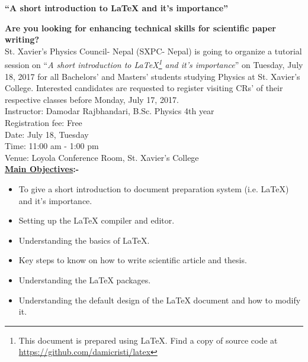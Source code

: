 \documentclass[a4paper,10pt]{article}
\begin{document}
\vspace*{2.1cm}

\begin{center}
\bfseries \LARGE \textquotedblleft A short introduction to \LaTeX \hspace{0.01cm} and it's importance\textquotedblright
\end{center}

\vspace{0.1cm} 

\textbf{Are you looking for enhancing technical skills for scientific paper writing?}\\

St. Xavier's Physics Council- Nepal (SXPC- Nepal) is going to organize a tutorial session on  \textquotedblleft \textit{A short introduction to \LaTeX\footnote{This document is prepared using \LaTeX. Find a copy of source code at \url{https://github.com/damicristi/latex}} and it's importance}\textquotedblright \hspace{0.01cm} on Tuesday, July 18, 2017 for all Bachelors' and Masters' students studying Physics at St. Xavier's College. Interested candidates are requested to register visiting CRs' of their respective classes before Monday, July 17, 2017. \\

Instructor: Damodar Rajbhandari, B.Sc. Physics 4th year\\
\hspace*{0.43cm} Registration fee: Free\\
\hspace*{0.43cm} Date: July 18, Tuesday\\
\hspace*{0.43cm}  Time: 11:00 am - 1:00 pm\\
\hspace*{0.43cm} Venue: Loyola Conference Room, St. Xavier's College\\


\textbf{\underline{Main Objectives}:-}
\begin{itemize}
\item To give a short introduction to document preparation system (i.e. \LaTeX) and it's importance.
\item Setting up the \LaTeX \hspace{0.01cm} compiler and editor.
\item Understanding the basics of \LaTeX.
\item Key steps to know on how to write scientific article and thesis.
\item Understanding the \LaTeX \hspace{0.01cm} packages.
\item Understanding the default design of the \LaTeX \hspace{0.01cm} document and how to modify it.  
\end{itemize}
\end{document}
